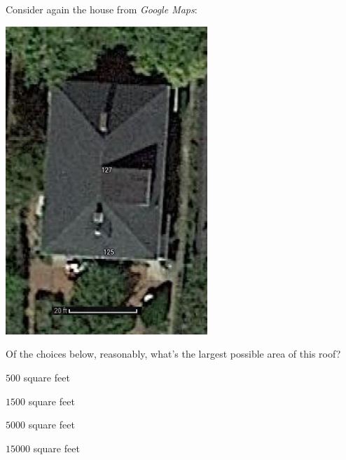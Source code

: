 \documentclass[noauthor,nooutcomes]{ximera}
\begin{document}
\begin{exercise}
  Consider again the house from \textit{Google Maps}:
  \begin{center}
    \includegraphics[width=3in]{mapsHouse.png}
  \end{center}
  Of the choices below, reasonably, what's the largest possible area of this roof?
  \begin{enumerate}\begin{multicols}{2}
    \item $500$ square feet
    \item $1500$ square feet
    \item $5000$ square feet
    \item $15000$ square feet 
    \end{multicols}
  \end{enumerate}
\end{exercise}





\end{document}
